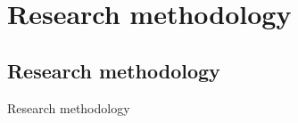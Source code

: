 \chapter{Research methodology}
\label{Research methodology}
  \singlespace
  \minitoc
  \onehalfspace
  \acresetall

\section{Research methodology}
\label{sec:Research methodology}
Research methodology\citep{Afonso2002}